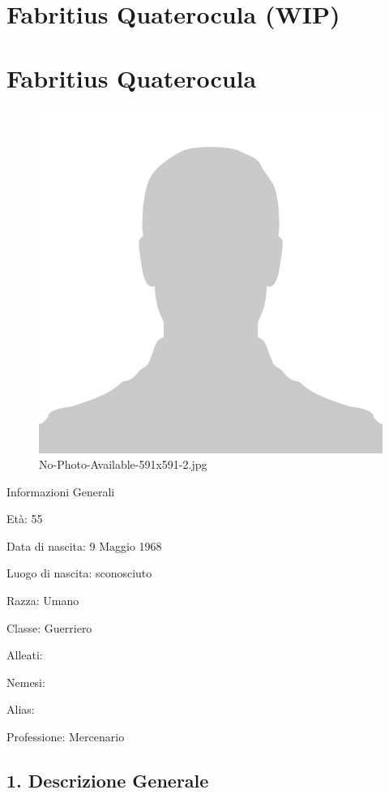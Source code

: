 \section{Fabritius Quaterocula (WIP)}\label{fabritius-quaterocula-wip}
\section{Fabritius Quaterocula}\label{fabritius-quaterocula}


\begin{figure}
\centering
\includegraphics{No-Photo-Available-591x591-2.jpg}
\caption{No-Photo-Available-591x591-2.jpg}
\end{figure}

Informazioni Generali

Età: 55

Data di nascita: 9 Maggio 1968

Luogo di nascita: sconosciuto

Razza: Umano

Classe: Guerriero

Alleati:

Nemesi:

Alias:

Professione: Mercenario


\subsection{1. Descrizione Generale}\label{descrizione-generale}


